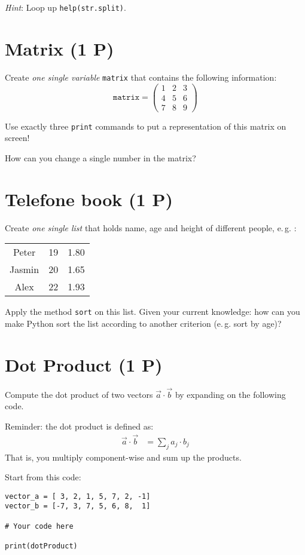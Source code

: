 \documentclass[
	ngerman,
	fontsize=10pt,
	parskip=half,
	titlepage=true,
	DIV=12
]{scrartcl}
\newcommand*{\inPy}[1]{\texttt{#1}}
\newcommand*{\eg}{e.\,g. }
\begin{document}
\emph{Hint}: Loop up \texttt{help(str.split)}.


\section{Matrix (1 P)}
Create \emph{one single variable} \inPy{matrix} that contains the following information:
\begin{equation*}
	\texttt{matrix} = \begin{pmatrix}
		1 & 2 & 3 \\
		4 & 5 & 6 \\
		7 & 8 & 9
	\end{pmatrix}
\end{equation*}

Use exactly three \inPy{print} commands to put a representation of this matrix on screen!

How can you change a single number in the matrix?

\section{Telefone book (1 P)}
Create \emph{one single list} that holds name, age and height of different people, \eg :
\begin{center}
	\begin{tabular}{ccc}
	Peter  & 19 & 1.80 \\
	Jasmin & 20 & 1.65 \\
	Alex   & 22 & 1.93
	\end{tabular}
\end{center}

Apply the method \inPy{sort} on this list. Given your current knowledge: how can you make Python sort the list according to another criterion (\eg sort by age)?


\section{Dot Product (1 P)}
Compute the dot product of two vectors $\vec{a} \cdot \vec{b}$ by expanding on the following code.

Reminder: the dot product is defined as:
\begin{align*}
	\vec{a} \cdot \vec{b} &= \sum_{j} a_j \cdot b_j
\end{align*}
That is, you multiply component-wise and sum up the products.

Start from this code:
\begin{verbatim}
vector_a = [ 3, 2, 1, 5, 7, 2, -1]
vector_b = [-7, 3, 7, 5, 6, 8,  1]

# Your code here

print(dotProduct)
\end{verbatim}
\end{document}
